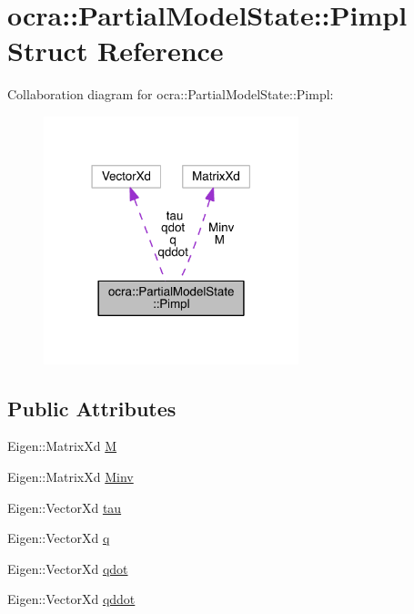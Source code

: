 \hypertarget{structocra_1_1PartialModelState_1_1Pimpl}{}\section{ocra\+:\+:Partial\+Model\+State\+:\+:Pimpl Struct Reference}
\label{structocra_1_1PartialModelState_1_1Pimpl}


Collaboration diagram for ocra\+:\+:Partial\+Model\+State\+:\+:Pimpl\+:\nopagebreak
\begin{figure}[H]
\begin{center}
\leavevmode
\includegraphics[width=210pt]{d6/da2/structocra_1_1PartialModelState_1_1Pimpl__coll__graph}
\end{center}
\end{figure}
\subsection*{Public Attributes}
\begin{DoxyCompactItemize}
\item 
Eigen\+::\+Matrix\+Xd \hyperlink{structocra_1_1PartialModelState_1_1Pimpl_aac1b2af908cd347c7c295d0461f605b7}{M}
\item 
Eigen\+::\+Matrix\+Xd \hyperlink{structocra_1_1PartialModelState_1_1Pimpl_a8fc2e9335c4fc0ff753fdb9850ad7bd5}{Minv}
\item 
Eigen\+::\+Vector\+Xd \hyperlink{structocra_1_1PartialModelState_1_1Pimpl_a74798b71925f4049758733f78a6cd571}{tau}
\item 
Eigen\+::\+Vector\+Xd \hyperlink{structocra_1_1PartialModelState_1_1Pimpl_a1533bd101072998a086254a0bdd9b9e9}{q}
\item 
Eigen\+::\+Vector\+Xd \hyperlink{structocra_1_1PartialModelState_1_1Pimpl_afaef50e83183344243397f3001f25c26}{qdot}
\item 
Eigen\+::\+Vector\+Xd \hyperlink{structocra_1_1PartialModelState_1_1Pimpl_a5a7b9332901dfbde222881933efe9a0d}{qddot}
\end{DoxyCompactItemize}



